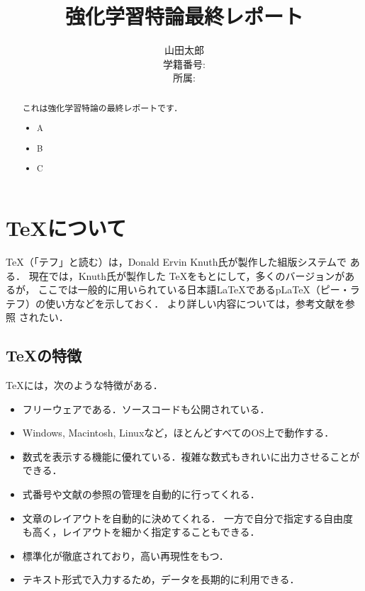 \documentclass[11pt]{jarticle} %
\title{強化学習特論最終レポート} %
\author{
  山田太郎\\
  学籍番号:\\
  所属:
} %
\begin{document}
\maketitle

\begin{abstract}
これは強化学習特論の最終レポートです．
\begin{itemize}
  \item A
  \item B
  \item C
\end{itemize}
\end{abstract}


\clearpage 
\tableofcontents
\clearpage

\section{\TeX について} %

\TeX （「テフ」と読む）は，Donald Ervin Knuth氏が製作した組版システムで
ある．
現在では，Knuth氏が製作した \TeX をもとにして，多くのバージョンがあるが，
ここでは一般的に用いられている日本語\LaTeX であるp\LaTeX （ピー・ラテフ）の使い方などを示しておく．
より詳しい内容については，参考文献\cite{Okumura,Yoshinaga,Shimizu}を参照
されたい．

\subsection{\TeX の特徴} %

\TeX には，次のような特徴がある．
\begin{itemize}
\item フリーウェアである．ソースコードも公開されている．
\item Windows, Macintosh, Linuxなど，ほとんどすべてのOS上で動作する． 
\item 数式を表示する機能に優れている．複雑な数式もきれいに出力させることができる．
\item 式番号や文献の参照の管理を自動的に行ってくれる．
\item 文章のレイアウトを自動的に決めてくれる．
一方で自分で指定する自由度も高く，レイアウトを細かく指定することもできる．
\item 標準化が徹底されており，高い再現性をもつ．
\item テキスト形式で入力するため，データを長期的に利用できる．
\end{itemize}

\end{document}
